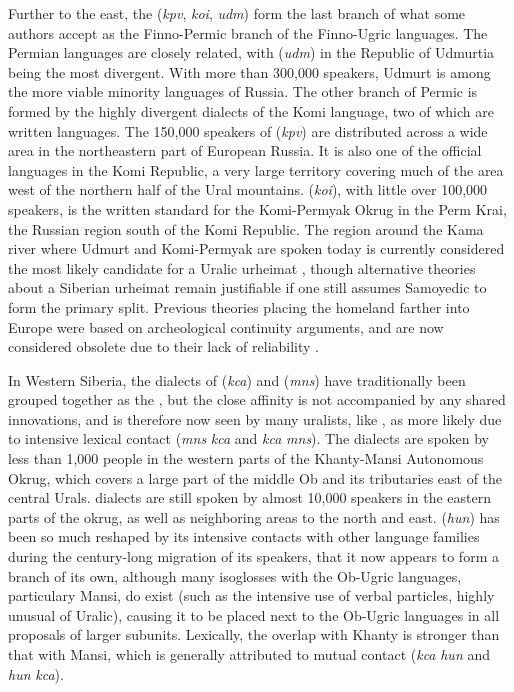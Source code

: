 Further to the east, the  (\textit{kpv}, \textit{koi}, \textit{udm}) form the last branch of what some authors accept as the Finno-Permic branch of the Finno-Ugric languages. The Permian languages are closely related, with  (\textit{udm}) in the Republic of Udmurtia being the most divergent. With more than 300,000 speakers, Udmurt is among the more viable minority languages of Russia. The other branch of Permic is formed by the highly divergent dialects of the Komi language, two of which are written languages. The 150,000 speakers of  (\textit{kpv}) are distributed across a wide area in the northeastern part of European Russia. It is also one of the official languages in the Komi Republic, a very large territory covering much of the area west of the northern half of the Ural mountains.  (\textit{koi}), with little over 100,000 speakers, is the written standard for the Komi-Permyak Okrug in the Perm Krai, the Russian region south of the Komi Republic. The region around the Kama river where Udmurt and Komi-Permyak are spoken today is currently considered the most likely candidate for a Uralic urheimat \citep{hakkinen2009}, though alternative theories about a Siberian urheimat remain justifiable if one still assumes Samoyedic to form the primary split. Previous theories placing the homeland farther into Europe were based on archeological continuity arguments, and are now considered obsolete due to their lack of reliability \citep{hakkinen2006}.

In Western Siberia, the dialects of  (\textit{kca}) and  (\textit{mns}) have traditionally been grouped together as the , but the close affinity is not accompanied by any shared innovations, and is therefore now seen by many uralists, like \cite{salminen2002}, as more likely due to intensive lexical contact (\textit{mns} \arrowOA \textit{kca} and \textit{kca} \arrowOA \textit{mns}). The  dialects are spoken by less than 1,000 people in the western parts of the Khanty-Mansi Autonomous Okrug, which covers a large part of the middle Ob and its tributaries east of the central Urals.  dialects are still spoken by almost 10,000 speakers in the eastern parts of the okrug, as well as neighboring areas to the north and east.  (\textit{hun}) has been so much reshaped by its intensive contacts with other language families during the century-long migration of its speakers, that it now appears to form a branch of its own, although many 
isoglosses with the Ob-Ugric languages, particulary Mansi, do exist (such as the intensive use of verbal particles, highly unusual of Uralic), causing it to be placed next to the Ob-Ugric languages in all proposals of larger subunits. Lexically, the overlap with Khanty is stronger than that with Mansi, which is generally attributed to mutual contact (\textit{kca} \arrowOA \textit{hun} and \textit{hun} \arrowOA \textit{kca}).

